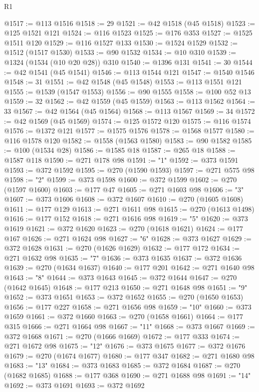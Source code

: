 \begin{lexlean}{R1}
\begin{coremodule}
@1517 := @113 @1516
@1518 := 29
@1521 := @42 @1518 (@45 @1518)
@1523 := @125 @1521 @121
@1524 := @116 @1523
@1525 := @176 @353
@1527 := @1525 @1511 @120
@1529 := @116 @1527 @133
@1530 := @1524 @1529
@1532 := @1512 (@1517 @1530)
@1533 := @90 @1532
@1534 := @10 @310
@1539 := @1324 (@1534 (@10 @20 @28)) @310
@1540 := @1396 @131
@1541 := 30
@1544 := @42 @1541 (@45 @1541)
@1546 := @113 @1544 @121
@1547 := @1540 @1546
@1548 := 31
@1551 := @42 @1548 (@45 @1548)
@1553 := @113 @1551 @121
@1555 := @1539 (@1547 @1553)
@1556 := @90 @1555
@1558 := @100 @52 @13
@1559 := 32
@1562 := @42 @1559 (@45 @1559)
@1563 := @113 @1562
@1564 := 33
@1567 := @42 @1564 (@45 @1564)
@1568 := @113 @1567
@1569 := 34
@1572 := @42 @1569 (@45 @1569)
@1574 := @125 @1572 @120
@1575 := @116 @1574
@1576 := @1372 @121
@1577 := @1575 @1576
@1578 := @1568 @1577
@1580 := @116 @1578 @120
@1582 := @1558 (@1563 @1580)
@1583 := @90 @1582
@1585 := @100 (@1534 @28)
@1586 := @1585 @18
@1587 := @265 @18
@1588 := @1587 @118
@1590 := @271 @178 @98
@1591 := "1"
@1592 := @373 @1591
@1593 := @372 @1592
@1595 := @270 (@1590 @1593)
@1597 := @271 @575 @98
@1598 := "2"
@1599 := @373 @1598
@1600 := @372 @1599
@1602 := @270 (@1597 @1600)
@1603 := @177 @47
@1605 := @271 @1603 @98
@1606 := "3"
@1607 := @373 @1606
@1608 := @372 @1607
@1610 := @270 (@1605 @1608)
@1611 := @177 @129
@1613 := @271 @1611 @98
@1615 := @270 (@1613 @1498)
@1616 := @177 @152
@1618 := @271 @1616 @98
@1619 := "5"
@1620 := @373 @1619
@1621 := @372 @1620
@1623 := @270 (@1618 @1621)
@1624 := @177 @167
@1626 := @271 @1624 @98
@1627 := "6"
@1628 := @373 @1627
@1629 := @372 @1628
@1631 := @270 (@1626 @1629)
@1632 := @177 @172
@1634 := @271 @1632 @98
@1635 := "7"
@1636 := @373 @1635
@1637 := @372 @1636
@1639 := @270 (@1634 @1637)
@1640 := @177 @201
@1642 := @271 @1640 @98
@1643 := "8"
@1644 := @373 @1643
@1645 := @372 @1644
@1647 := @270 (@1642 @1645)
@1648 := @177 @213
@1650 := @271 @1648 @98
@1651 := "9"
@1652 := @373 @1651
@1653 := @372 @1652
@1655 := @270 (@1650 @1653)
@1656 := @177 @227
@1658 := @271 @1656 @98
@1659 := "10"
@1660 := @373 @1659
@1661 := @372 @1660
@1663 := @270 (@1658 @1661)
@1664 := @177 @315
@1666 := @271 @1664 @98
@1667 := "11"
@1668 := @373 @1667
@1669 := @372 @1668
@1671 := @270 (@1666 @1669)
@1672 := @177 @333
@1674 := @271 @1672 @98
@1675 := "12"
@1676 := @373 @1675
@1677 := @372 @1676
@1679 := @270 (@1674 @1677)
@1680 := @177 @347
@1682 := @271 @1680 @98
@1683 := "13"
@1684 := @373 @1683
@1685 := @372 @1684
@1687 := @270 (@1682 @1685)
@1688 := @177 @368
@1690 := @271 @1688 @98
@1691 := "14"
@1692 := @373 @1691
@1693 := @372 @1692

\end{coremodule}
\end{lexlean}

